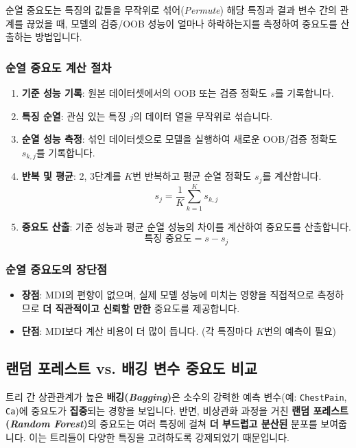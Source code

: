\documentclass[11pt,a4paper]{book}
\theoremstyle{definition}
\begin{document}
\begin{tcolorbox}[infobox]
순열 중요도는 특징의 값들을 무작위로 섞어(\emph{Permute}) 해당 특징과 결과 변수 간의 관계를 끊었을 때, 모델의 검증/OOB 성능이 얼마나 하락하는지를 측정하여 중요도를 산출하는 방법입니다.
\end{tcolorbox}

\subsubsection*{순열 중요도 계산 절차}
\begin{enumerate}
    \item \textbf{기준 성능 기록}: 원본 데이터셋에서의 OOB 또는 검증 정확도 $s$를 기록합니다.
    \item \textbf{특징 순열}: 관심 있는 특징 $j$의 데이터 열을 무작위로 섞습니다.
    \item \textbf{순열 성능 측정}: 섞인 데이터셋으로 모델을 실행하여 새로운 OOB/검증 정확도 $s_{k,j}$를 기록합니다.
    \item \textbf{반복 및 평균}: 2, 3단계를 $K$번 반복하고 평균 순열 정확도 $s_j$를 계산합니다.
    $$s_{j}=\frac{1}{K}\sum_{k=1}^{K}s_{k,j}$$
    \item \textbf{중요도 산출}: 기준 성능과 평균 순열 성능의 차이를 계산하여 중요도를 산출합니다.
    $$\text{특징 중요도} = s - s_{j}$$
\end{enumerate}

\subsubsection*{순열 중요도의 장단점}
\begin{itemize}
    \item \textbf{장점}: MDI의 편향이 없으며, 실제 모델 성능에 미치는 영향을 직접적으로 측정하므로 \textbf{더 직관적이고 신뢰할 만한} 중요도를 제공합니다.
    \item \textbf{단점}: MDI보다 계산 비용이 더 많이 듭니다. (각 특징마다 $K$번의 예측이 필요)
\end{itemize}

\subsection{랜덤 포레스트 vs. 배깅 변수 중요도 비교}
트리 간 상관관계가 높은 \textbf{배깅(\emph{Bagging})}은 소수의 강력한 예측 변수(예: \texttt{ChestPain}, \texttt{Ca})에 중요도가 \textbf{집중}되는 경향을 보입니다.
반면, 비상관화 과정을 거친 \textbf{랜덤 포레스트(\emph{Random Forest})}의 중요도는 여러 특징에 걸쳐 \textbf{더 부드럽고 분산된} 분포를 보여줍니다. 이는 트리들이 다양한 특징을 고려하도록 강제되었기 때문입니다.
\end{document}
